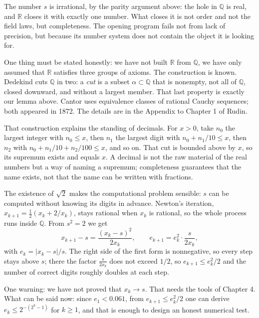 The number $s$ is irrational, by the parity argument above: the hole in $\mathbb{Q}$ is
real, and $\mathbb{R}$ closes it with exactly one number. What closes it is not order
and not the field laws, but completeness. The opening program fails not from lack of
precision, but because its number system does not contain the object it is looking for.

One thing must be stated honestly: we have not built $\mathbb{R}$ from $\mathbb{Q}$, we
have only assumed that $\mathbb{R}$ satisfies three groups of axioms. The construction
is known. Dedekind cuts $\mathbb{Q}$ in two: a \emph{cut} is a subset
$\alpha\subset\mathbb{Q}$ that is nonempty, not all of $\mathbb{Q}$, closed downward,
and without a largest member. That last property is exactly our lemma above. Cantor
uses equivalence classes of rational Cauchy sequences; both appeared in 1872. The
details are in the Appendix to Chapter 1 of Rudin.

That construction explains the standing of decimals. For $x>0$, take $n_0$ the largest
integer with $n_0\le x$, then $n_1$ the largest digit with $n_0+n_1/10\le x$, then
$n_2$ with $n_0+n_1/10+n_2/100\le x$, and so on. That cut is bounded above by $x$, so
its supremum exists and equals $x$. A decimal is not the raw material of the real
numbers but a way of naming a supremum; completeness guarantees that the name exists,
not that the name can be written with fractions.


The existence of $\sqrt2$ makes the computational problem sensible: $s$ can be
computed without knowing its digits in advance. Newton's iteration,
$x_{k+1}=\frac12(x_k+2/x_k)$, stays rational when $x_k$ is rational, so the whole
process runs inside $\mathbb{Q}$. From $s^2=2$ we get
\[
x_{k+1}-s=\frac{(x_k-s)^2}{2x_k},\qquad e_{k+1}=e_k^2\cdot\frac{s}{2x_k},
\]
with $e_k=|x_k-s|/s$. The right side of the first form is nonnegative, so every step
stays above $s$; there the factor $\frac{s}{2x_k}$ does not exceed $1/2$, so
$e_{k+1}\le e_k^2/2$ and the number of correct digits roughly doubles at each step.

One warning: we have not proved that $x_k\to s$. That needs the tools of Chapter 4.
What can be said now: since $e_1<0.061$, from $e_{k+1}\le e_k^2/2$ one can derive
$e_k\le 2^{-(2^k-1)}$ for $k\ge 1$, and that is enough to design an honest numerical
test.

